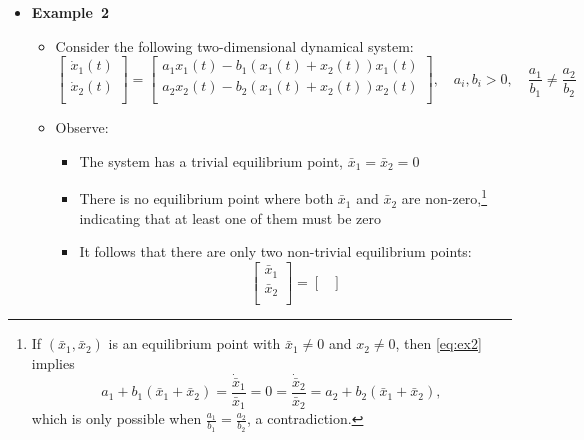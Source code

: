 \documentclass[12pt,a4paper]{article}
\begin{document}
\begin{itemize}
\item \textbf{Example~2}
  \begin{itemize}
  \item Consider the following two-dimensional dynamical system:
    \begin{equation}\label{eq:ex2}%
      \begin{bmatrix}
        \dot{x}_{1}(t) \\
        \dot{x}_{2}(t) \\
      \end{bmatrix}
      =
      \begin{bmatrix}
      a_{1}x_{1}(t) - b_{1}(x_{1}(t)+x_{2}(t))x_{1}(t) \\
      a_{2}x_{2}(t) - b_{2}(x_{1}(t)+x_{2}(t))x_{2}(t) \\
      \end{bmatrix},
      \quad
      a_{i}, b_{i}>0,
      \quad
      \frac{a_{1}}{b_{1}} \neq \frac{a_{2}}{b_{2}}
    \end{equation}
  \item Observe:
    \begin{itemize}
    \item The system has a trivial equilibrium point, $\bar{x}_{1}=\bar{x}_{2} = 0$
    \item There is no equilibrium point where both $\bar{x}_{1}$ and $\bar{x}_{2}$ are non-zero,\footnote{
        If $(\bar{x}_{1}, \bar{x}_{2})$ is an equilibrium point with $\bar{x}_{1}\neq 0$ and $x_{2}\neq 0$,
        then \eqref{eq:ex2} implies
        \begin{equation}\nonumber%
          a_{1} + b_{1}(\bar{x}_{1}+\bar{x}_{2})
          = \frac{\dot{\bar{x}}_{1}}{\bar{x}_{1}}
          = 0
          = \frac{\dot{\bar{x}}_{2}}{\bar{x}_{2}}
          =
          a_{2} + b_{2}(\bar{x}_{1}+\bar{x}_{2}),
        \end{equation}
        which is only possible when $\frac{a_{1}}{b_{1}} = \frac{a_{2}}{b_{2}}$, a contradiction.
      } indicating that at least one of them must be zero
    \item It follows that there are only two non-trivial equilibrium points:
      \begin{equation}\nonumber%
        \begin{bmatrix}
          \bar{x}_{1} \\
          \bar{x}_{2} \\
        \end{bmatrix}
        = 
        \begin{bmatrix}

\end{bmatrix}
\end{equation}
\end{itemize}
\end{itemize}
\end{itemize}
\end{document}
